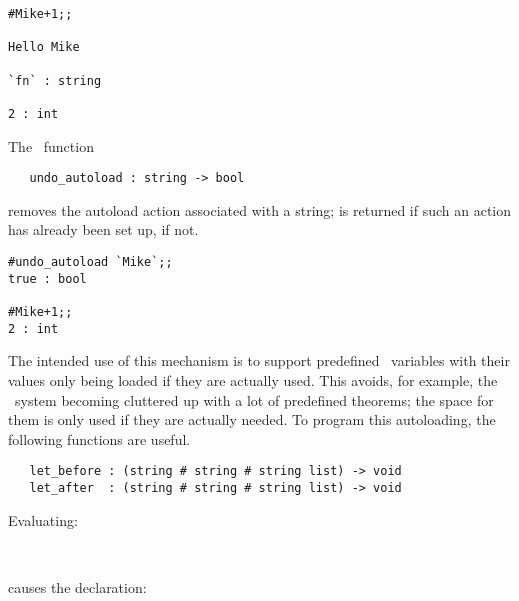 \begin{session}\begin{verbatim}
#Mike+1;;

Hello Mike

`fn` : string

2 : int
\end{verbatim}\end{session}

The \ML\ function

\begin{boxed}
\begin{verbatim}
   undo_autoload : string -> bool
\end{verbatim}\end{boxed}

\noindent removes the autoload action associated with a string;  is
returned if such an action has already been set up,  if not.

\begin{session}\begin{verbatim}
#undo_autoload `Mike`;;
true : bool

#Mike+1;;
2 : int
\end{verbatim}\end{session}

The intended use of this mechanism is to support predefined \ML\ variables
with their values only being loaded if they are actually used. This avoids,
for example, the \HOL\ system becoming cluttered up with a lot of predefined
theorems; the space for them is only used if they are actually needed. To
program this autoloading, the following functions are useful.


\begin{boxed}
\begin{verbatim}
   let_before : (string # string # string list) -> void
   let_after  : (string # string # string list) -> void
\end{verbatim}\end{boxed}

Evaluating:

\bigskip

{\small
\noindent\ \ \ 
}

\bigskip

\noindent causes the declaration:

